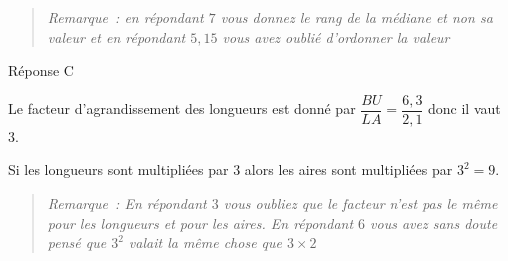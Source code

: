 \begin{description}[itemsep=1em]
    \begin{quote}
    \textit{Remarque~: en répondant $7$ vous donnez le rang de la médiane et non sa valeur et en  répondant $5,15$ vous avez oublié d'ordonner la valeur} 
  \end{quote}
  \item[Question 5] Réponse C
  
    Le facteur d'agrandissement des longueurs est donné par $\dfrac{BU}{LA}=\dfrac{6,3}{2,1}$ donc il vaut $3$.

    Si les longueurs sont multipliées par $3$ alors les aires sont multipliées par $3^2=9$.
    
    \begin{quote}
    \textit{Remarque~: En répondant $3$ vous oubliez que le facteur n'est pas le même pour les longueurs et pour les aires. En répondant $6$ vous avez sans doute pensé que $3^2$ valait la même chose que $3\times2$} 
  \end{quote}
\end{description}
\medskip

\clearpage
